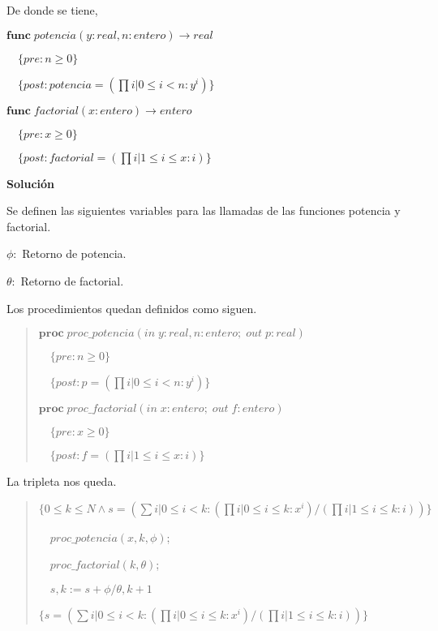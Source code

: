 \documentclass[hidelinks]{article}
\newenvironment{absolutelynopagebreak}
{\Needspace{10\baselineskip}\begin{quote}}
		{\end{quote}}
\begin{document}
De donde se tiene, \par

$\textbf{func} \; potencia(y: real, n: entero) \rightarrow real$ \par
$\quad \{pre: n \geq 0\}$ \par
$\quad \{post: potencia= (\prod i| 0 \leq i < n: y^i)\}$\par

$\textbf{func} \; factorial(x: entero) \rightarrow entero$ \par
$\quad \{pre: x \geq 0\}$ \par
$\quad \{post: factorial= (\prod i| 1 \leq i \leq x: i)\}$\par

\textbf{Solución}\par

Se definen las siguientes variables para las llamadas de las funciones potencia
y factorial.\par

$\phi: $ Retorno de potencia.\par
$\theta: $ Retorno de factorial.\par

Los procedimientos quedan definidos como siguen.\par
\begin{absolutelynopagebreak}
	$\textbf{proc} \; proc\_potencia(in \; y: real, n: entero; \; out \; p: real)$ \par
	$\quad \{pre: n \geq 0\}$ \par
	$\quad \{post: p = (\prod i| 0 \leq i < n: y^i)\}$\par

	$\textbf{proc} \; proc\_factorial(in \; x: entero; \; out \; f: entero)$ \par
	$\quad \{pre: x \geq 0\}$ \par
	$\quad \{post: f = (\prod i| 1 \leq i \leq x: i)\}$\par
\end{absolutelynopagebreak}

La tripleta nos queda. \par

\begin{absolutelynopagebreak}
	$\{0 \leq k \leq N \land s = (\sum i| 0 \leq i < k: (\prod i| 0 \leq i \leq k : x^i) / (\prod i| 1 \leq i \leq k : i))\}$ \par
	$\quad proc\_potencia(x,k,\phi)$; \par
	$\quad proc\_factorial(k,\theta)$; \par
	$\quad s,k := s + \phi/\theta, k + 1$ \par
	$\{ s = (\sum i| 0 \leq i < k: (\prod i| 0 \leq i \leq k : x^i) / (\prod i| 1 \leq i \leq k : i))\}$ \par
\end{absolutelynopagebreak}
\end{document}
